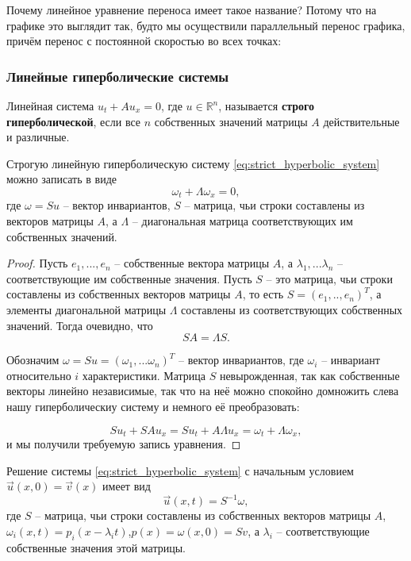 \documentclass[../main.tex]{subfile}
\begin{document}
Почему линейное уравнение переноса имеет такое название? Потому что на графике
это выглядит так, будто мы осуществили параллельный перенос графика, причём
перенос с постоянной скоростью во всех точках: \\



\subsubsection{Линейные гиперболические системы}
\begin{define}\label{eq:strict_hyperbolic_system}
	Линейная система $u_t+Au_x=0$, где $u\in \mathbb R^n$, называется
	\textbf{строго гиперболической}, если все $n$ собственных значений
	матрицы $A$ действительные и различные.
\end{define}

\begin{lemma}\label{eq:hyperbolic_invariant_form}
	Строгую линейную гиперболическую систему
	\eqref{eq:strict_hyperbolic_system} можно записать в виде
	\[\boxed{\omega_t+\Lambda\omega_x=0},\]
	где $\omega=Su$ -- вектор инвариантов, $S$ -- матрица, чьи строки
	составлены из векторов матрицы $A$, а $\Lambda$ -- диагональная матрица
	соответствующих им собственных значений.
\end{lemma}

\begin{proof}
	Пусть $e_1,...,e_n$ -- собственные вектора матрицы $A$, а $\lambda_1,...
	\lambda_n$ -- соответствующие им собственные значения. Пусть $S$ -- это
	матрица, чьи строки составлены из собственных векторов матрицы $A$, то
	есть $S=(e_1,..,e_n)^T$, а элементы диагональной матрицы $\Lambda$
	составлены из соответствующих собственных значений. Тогда очевидно, что
	\[SA=\Lambda S.\]

	Обозначим $\omega=Su=(\omega_1,...\omega_n)^T$ -- вектор инвариантов,
	где $\omega_i$ -- инвариант относительно $i$ характеристики. Матрица $S$
	невырожденная, так как собственные векторы линейно независимые, так что
	на неё можно спокойно домножить слева нашу гиперболическиу систему
	и немного её преобразовать:

	\[Su_t+SAu_x=Su_t+A\Lambda u_x=\omega_t+\Lambda\omega_x,\]
	и мы получили требуемую запись уравнения.
\end{proof}

\begin{theorem}
	Решение системы \eqref{eq:strict_hyperbolic_system} с начальным условием
	$\vec{u}(x,0)=\vec{v}(x)$ имеет вид
	\[\vec{u}(x,t)=S^{-1}\omega,\]
	где $S$ -- матрица, чьи строки составлены из собственных векторов
	матрицы $A$, $\omega_i(x,t)=p_i(x-\lambda_i t)$,\quad $p(x)=
	\omega(x,0)=Sv$, а $\lambda_i$ -- соответствующие собственные значения
	этой матрицы.
\end{theorem}
\end{document}
